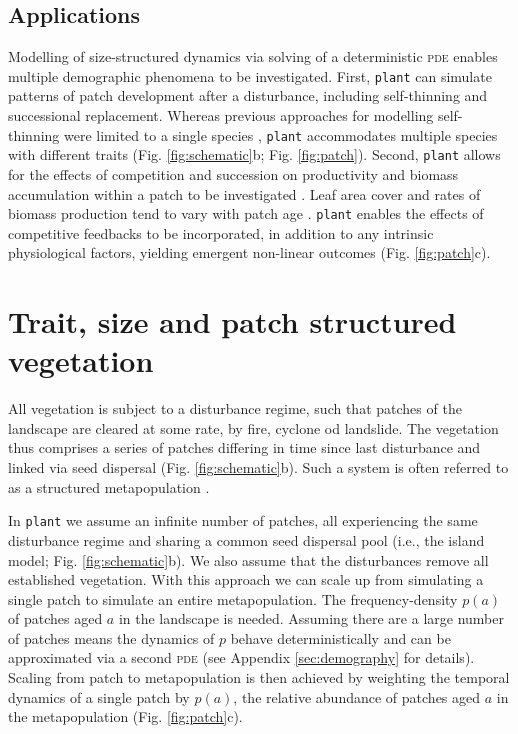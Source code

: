 \documentclass[a4paper,11pt]{article}
\newcommand{\plant}{\texttt{plant}}
\begin{document}
\subsection{Applications}

Modelling of size-structured dynamics via solving of a deterministic
\textsc{pde} enables multiple demographic phenomena to be
investigated. First, {\plant} can simulate patterns of patch
development after a disturbance, including self-thinning and
successional replacement. Whereas previous approaches for modelling
self-thinning were limited to a single species
\citep[e.g.][]{Barnes-2004, Coomes-2007}, {\plant} accommodates
multiple species with different traits (Fig. \ref{fig:schematic}b;
Fig.  \ref{fig:patch}). Second, {\plant} allows for the effects of
competition and succession on productivity and biomass accumulation
within a patch to be investigated \citep{Falster-2011}. Leaf area
cover and rates of biomass production tend to vary with patch age
\citep{Binkley-2002, Smith-2001, Coomes-2007, Ogawa-2010}. 
{\plant} enables the effects of competitive feedbacks to be
incorporated, in addition to any intrinsic physiological factors,
yielding emergent non-linear outcomes (Fig. \ref{fig:patch}c).

\section{Trait, size and patch structured vegetation}

All vegetation is subject to a disturbance regime, such that patches
of the landscape are cleared at some rate, by fire, cyclone od
landslide.  The vegetation thus comprises a series of patches
differing in time since last disturbance and linked via seed dispersal
(Fig.  \ref{fig:schematic}b). Such a system is often referred to as a
structured metapopulation \citep{Gyllenberg-2001}.

In {\plant} we assume an infinite number of patches, all experiencing
the same disturbance regime and sharing a common seed dispersal pool
(i.e., the island model; Fig. \ref{fig:schematic}b). We also assume
that the disturbances remove all established vegetation.  With this
approach we can scale up from simulating a single patch to simulate an
entire metapopulation.  The frequency-density \(p(a)\) of patches aged
\(a\) in the landscape is needed. Assuming there are a large number of
patches means the dynamics of \(p\) behave deterministically and can
be approximated via a second \textsc{pde} (see Appendix
\ref{sec:demography} for details). Scaling from patch to
metapopulation is then achieved by weighting the temporal dynamics of
a single patch by \(p(a)\), the relative abundance of patches aged
\(a\) in the metapopulation (Fig. \ref{fig:patch}c).
\end{document}
